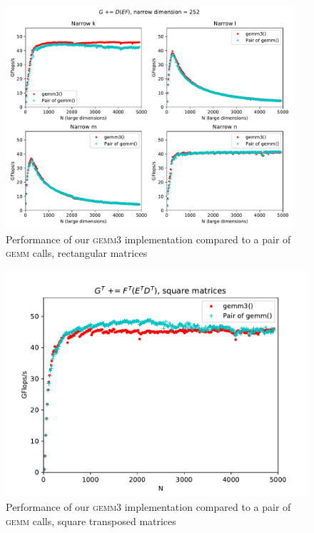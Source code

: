 \documentclass[12pt]{article}
\newcommand*{\gemmt}{{\textsc{gemm3}}}
\newcommand*{\gemm}{{\textsc{gemm}}}
\begin{document}
\begin{figure}
  \centering
  \includegraphics[width=0.95\textwidth]{../results/earwig-correct-rectangle-flops/gemm3_rectangles}
  \caption{Performance of our \gemmt{} implementation compared to a pair of \gemm{} calls, rectangular matrices}
  \label{fig:bc_rectangles}
\end{figure}

\begin{figure}
  \centering
  \includegraphics[height=0.40\textheight]{../results/earwig2/gemm3_ab_bc_kernel}
  \caption{Performance of our \gemmt{} implementation compared to a pair of \gemm{} calls, square transposed matrices}
  \label{fig:ab_square}
\end{figure}
\end{document}
